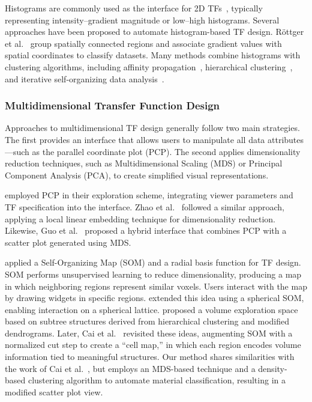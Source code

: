 Histograms are commonly used as the interface for 2D TFs~\cite{kniss2002}, typically representing intensity–gradient magnitude or low–high histograms. Several approaches have been proposed to automate histogram-based TF design. Röttger et al.~\cite{roettger2005} group spatially connected regions and associate gradient values with spatial coordinates to classify datasets. Many methods combine histograms with clustering algorithms, including affinity propagation~\cite{zhang2016}, hierarchical clustering~\cite{sereda2006}, and iterative self-organizing data analysis~\cite{tzeng2004}.

\subsubsection{Multidimensional Transfer Function Design}

Approaches to multidimensional TF design generally follow two main strategies. The first provides an interface that allows users to manipulate all data attributes—such as the parallel coordinate plot (PCP). The second applies dimensionality reduction techniques, such as Multidimensional Scaling (MDS) or Principal Component Analysis (PCA), to create simplified visual representations.

\cite{tory2005} employed PCP in their exploration scheme, integrating viewer parameters and TF specification into the interface. Zhao et al.~\cite{zhao2010} followed a similar approach, applying a local linear embedding technique for dimensionality reduction. Likewise, Guo et al.~\cite{guo2011} proposed a hybrid interface that combines PCP with a scatter plot generated using MDS.

\cite{moura2007} applied a Self-Organizing Map (SOM) and a radial basis function for TF design. SOM performs unsupervised learning to reduce dimensionality, producing a map in which neighboring regions represent similar voxels. Users interact with the map by drawing widgets in specific regions. \cite{khan2015} extended this idea using a spherical SOM, enabling interaction on a spherical lattice. \cite{wang2011} proposed a volume exploration space based on subtree structures derived from hierarchical clustering and modified dendrograms. Later, Cai et al.~\cite{cai2017} revisited these ideas, augmenting SOM with a normalized cut step to create a “cell map,” in which each region encodes volume information tied to meaningful structures. Our method shares similarities with the work of Cai et al.~\cite{cai2017}, but employs an MDS-based technique and a density-based clustering algorithm to automate material classification, resulting in a modified scatter plot view.

